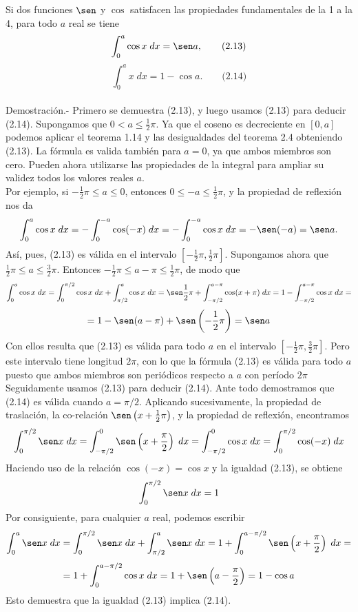 \begin{teo} Si dos funciones $\sen$ y $\cos$ satisfacen las propiedades fundamentales de la 1 a la 4, para todo $a$ real se tiene $$\int_0^a \cos x\; dx = \sen a, \qquad \mbox{(2.13)}$$ $$\int_0^a x\; dx = 1-\cos a. \qquad \mbox{(2.14)}$$\\
    Demostración.-\; Primero se demuestra (2.13), y luego usamos (2.13) para deducir (2.14). Supongamos que $0<a\leq \frac{1}{2}\pi$. Ya que el coseno es decreciente en $[0,a]$ podemos aplicar el teorema 1.14 y las desigualdades del teorema 2.4 obteniendo (2.13). La fórmula es valida también para $a=0$, ya que ambos miembros son cero. Pueden ahora  utilizarse las propiedades de la integral para ampliar su validez todos los valores reales $a$.\\
    Por ejemplo, si $-\frac{1}{2}\pi \leq a \leq 0$, entonces $0\leq -a\leq \frac{1}{2}\pi$, y la propiedad de reflexión nos da $$\int_0^a \cos x\; dx = -\int_0^{-a} \cos (-x) \; dx = - \int_0^{-a} \cos x \; dx = -\sen (-a) = \sen a.$$
    Así, pues, (2.13) es válida en el intervalo $\left[-\frac{1}{2}\pi,\frac{1}{2}\pi\right]$. Supongamos ahora que $\frac{1}{2}\pi \leq a \leq \frac{3}{2}\pi$. Entonces $-\frac{1}{2}\pi\leq a-\pi\leq \frac{1}{2}\pi$, de modo que $$\int_0^a \cos x \; dx = \int_{0}^{\pi/2} \cos x \; dx + \int_{\pi/2}^a \cos x \; dx = \sen\frac{1}{2}\pi + \int_{-\pi/2}^{a-\pi} \cos(x+\pi)\; dx = 1-\int_{-\pi/2}^{a-\pi} \cos x \; dx = $$ $$=1 - \sen(a-\pi) + \sen\left(-\frac{1}{2}\pi\right) = \sen a$$
    Con ellos resulta que (2.13) es válida para todo $a$ en el intervalo $\left[-\frac{1}{2}\pi,\frac{3}{2}\pi\right]$. Pero este intervalo tiene longitud $2\pi$, con lo que la fórmula (2.13) es válida para todo $a$ puesto que ambos miembros son periódicos respecto a $a$ con período $2\pi$\\
    Seguidamente usamos (2.13) para deducir (2.14). Ante todo demostramos que (2.14) es válida cuando $a=\pi/2$. Aplicando sucesivamente, la propiedad de traslación, la co-relación $\sen\left(x+\frac{1}{2}\pi\right)$, y la propiedad de reflexión, encontramos 
    $$\int_0^{\pi/2}\sen x\; dx = \int_{-\pi/2}^0 \sen \left(x+\dfrac{\pi}{2}\right)\; dx = \int_{-\pi/2}^0 \cos x \; dx = \int_0^{\pi/2}\cos (-x) \; dx$$
    Haciendo uso de la relación $\cos(-x)=\cos x$ y la igualdad (2.13), se obtiene $$\int_0^{\pi/2}\sen x\; dx = 1$$
    Por consiguiente, para cualquier $a$ real, podemos escribir $$\int_0^a \sen x\;dx = \int_0^{\pi/2} \sen x\; dx + \int_{\pi/2}^a \sen x \; dx = 1 + \int_0^{a-\pi/2}\sen \left(x+\dfrac{\pi}{2}\right)\; dx =$$ $$= 1+\int_0^{a-\pi/2} \cos x \; dx = 1+\sen\left(a-\dfrac{\pi}{2}\right) = 1-\cos a$$
    Esto demuestra que la igualdad (2.13) implica (2.14).\\\\
\end{teo}

